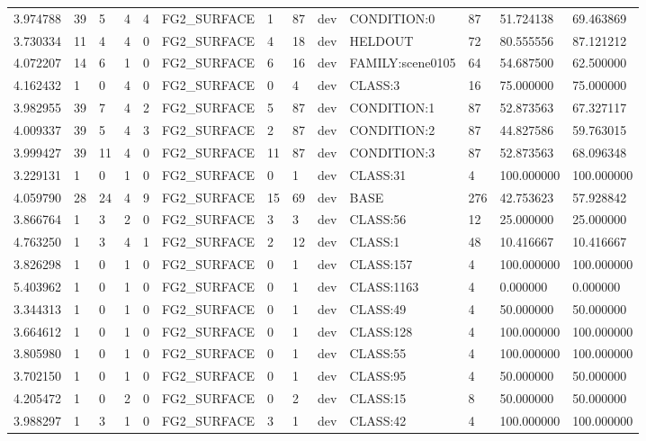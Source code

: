 \begin{tabular}{lllllllllllll}
3.974788 & 39 & 5 & 4 & 4 & FG2\_SURFACE & 1 & 87 & dev & CONDITION:0 & 87 & 51.724138 & 69.463869 \\
3.730334 & 11 & 4 & 4 & 0 & FG2\_SURFACE & 4 & 18 & dev & HELDOUT & 72 & 80.555556 & 87.121212 \\
4.072207 & 14 & 6 & 1 & 0 & FG2\_SURFACE & 6 & 16 & dev & FAMILY:scene0105 & 64 & 54.687500 & 62.500000 \\
4.162432 & 1 & 0 & 4 & 0 & FG2\_SURFACE & 0 & 4 & dev & CLASS:3 & 16 & 75.000000 & 75.000000 \\
3.982955 & 39 & 7 & 4 & 2 & FG2\_SURFACE & 5 & 87 & dev & CONDITION:1 & 87 & 52.873563 & 67.327117 \\
4.009337 & 39 & 5 & 4 & 3 & FG2\_SURFACE & 2 & 87 & dev & CONDITION:2 & 87 & 44.827586 & 59.763015 \\
3.999427 & 39 & 11 & 4 & 0 & FG2\_SURFACE & 11 & 87 & dev & CONDITION:3 & 87 & 52.873563 & 68.096348 \\
3.229131 & 1 & 0 & 1 & 0 & FG2\_SURFACE & 0 & 1 & dev & CLASS:31 & 4 & 100.000000 & 100.000000 \\
4.059790 & 28 & 24 & 4 & 9 & FG2\_SURFACE & 15 & 69 & dev & BASE & 276 & 42.753623 & 57.928842 \\
3.866764 & 1 & 3 & 2 & 0 & FG2\_SURFACE & 3 & 3 & dev & CLASS:56 & 12 & 25.000000 & 25.000000 \\
4.763250 & 1 & 3 & 4 & 1 & FG2\_SURFACE & 2 & 12 & dev & CLASS:1 & 48 & 10.416667 & 10.416667 \\
3.826298 & 1 & 0 & 1 & 0 & FG2\_SURFACE & 0 & 1 & dev & CLASS:157 & 4 & 100.000000 & 100.000000 \\
5.403962 & 1 & 0 & 1 & 0 & FG2\_SURFACE & 0 & 1 & dev & CLASS:1163 & 4 & 0.000000 & 0.000000 \\
3.344313 & 1 & 0 & 1 & 0 & FG2\_SURFACE & 0 & 1 & dev & CLASS:49 & 4 & 50.000000 & 50.000000 \\
3.664612 & 1 & 0 & 1 & 0 & FG2\_SURFACE & 0 & 1 & dev & CLASS:128 & 4 & 100.000000 & 100.000000 \\
3.805980 & 1 & 0 & 1 & 0 & FG2\_SURFACE & 0 & 1 & dev & CLASS:55 & 4 & 100.000000 & 100.000000 \\
3.702150 & 1 & 0 & 1 & 0 & FG2\_SURFACE & 0 & 1 & dev & CLASS:95 & 4 & 50.000000 & 50.000000 \\
4.205472 & 1 & 0 & 2 & 0 & FG2\_SURFACE & 0 & 2 & dev & CLASS:15 & 8 & 50.000000 & 50.000000 \\
3.988297 & 1 & 3 & 1 & 0 & FG2\_SURFACE & 3 & 1 & dev & CLASS:42 & 4 & 100.000000 & 100.000000 \\

\end{tabular}
